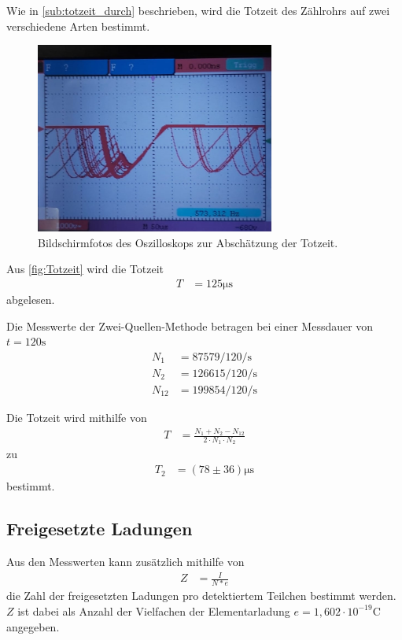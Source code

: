 Wie in \autoref{sub:totzeit_durch} beschrieben, wird die Totzeit des Zählrohrs auf zwei verschiedene Arten bestimmt.
\begin{figure}[H]
  \centering
  \includegraphics[width=0.7\textwidth]{Abbildungen/Oszilloskop.jpeg}
  \caption {Bildschirmfotos des Oszilloskops zur Abschätzung der Totzeit.}
  \label{fig:Totzeit}
\end{figure}

Aus \autoref{fig:Totzeit} wird die Totzeit
\begin{align*}
  T&= 125 \si{\micro\second}
\end{align*}
abgelesen.

Die Messwerte der Zwei-Quellen-Methode betragen bei einer Messdauer von $t=120\si{\second}$
\begin{align*}
  N_1 &= 87579/120 \si{\per\second}\\
  N_2 &= 126615/120 \si{\per\second}\\
  N_{12} &= 199854/120 \si{\per\second}
\end{align*}

Die Totzeit wird mithilfe von
\begin{align*}
  T&= \frac{N_1+N_2-N_{12}}{2\cdot N_1 \cdot N_2} \label{eqn:totzeit}
\end{align*}
zu 
\begin{align*}
  T_2 &= (78 \pm 36)\si{\micro\second}
\end{align*}
bestimmt.

\subsection{Freigesetzte Ladungen}
\label{sub:ladungen_aus}

Aus den Messwerten kann zusätzlich mithilfe von
\begin{align*}
  Z &= \frac{I}{N*e}
\end{align*}
die Zahl der freigesetzten Ladungen pro detektiertem Teilchen bestimmt werden.
$Z$ ist dabei als Anzahl der Vielfachen der Elementarladung $e= 1,602\cdot 10^{-19}\si{\coulomb}$ angegeben.


